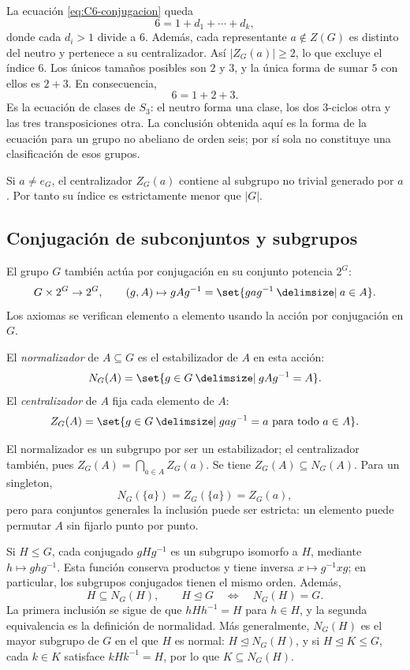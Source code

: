 La ecuación \eqref{eq:C6-conjugacion} queda
\[
6=1+d_1+\cdots+d_k,
\]
donde cada $d_i>1$ divide a $6$. Además, cada representante $a\notin Z(G)$ es distinto del neutro y pertenece a su centralizador. Así $|Z_G(a)|\ge2$, lo que excluye el índice $6$. Los únicos tamaños posibles son $2$ y $3$, y la única forma de sumar $5$ con ellos es $2+3$. En consecuencia,
\[
6=1+2+3.
\]
Es la ecuación de clases de $S_3$: el neutro forma una clase, los dos $3$-ciclos otra y las tres transposiciones otra. La conclusión obtenida aquí es la forma de la ecuación para un grupo no abeliano de orden seis; por sí sola no constituye una clasificación de esos grupos.
\begin{obs}
Si $a\ne e_G$, el centralizador $Z_G(a)$ contiene al subgrupo no trivial generado por $a$. Por tanto su índice es estrictamente menor que $|G|$.
\end{obs}

\subsection{Conjugación de subconjuntos y subgrupos}\label{tema:6-3-1}
El grupo $G$ también actúa por conjugación en su conjunto potencia $2^G$:
\[
G\times2^G\to2^G,\qquad(g,A)\mapsto gAg^{-1}
=\set{gag^{-1}\given a\in A}.
\]
Los axiomas se verifican elemento a elemento usando la acción por conjugación en $G$.

\begin{defi}
El \emph{normalizador} de $A\subseteq G$ es el estabilizador de $A$ en esta acción:
\[
N_G(A)=\set{g\in G\given gAg^{-1}=A}.
\]
El \emph{centralizador} de $A$ fija cada elemento de $A$:
\[
Z_G(A)=\set{g\in G\given gag^{-1}=a\text{ para todo }a\in A}.
\]
\end{defi}
El normalizador es un subgrupo por ser un estabilizador; el centralizador también, pues $Z_G(A)=\bigcap_{a\in A}Z_G(a)$. Se tiene $Z_G(A)\subseteq N_G(A)$. Para un singleton,
\[
N_G(\{a\})=Z_G(\{a\})=Z_G(a),
\]
pero para conjuntos generales la inclusión puede ser estricta: un elemento puede permutar $A$ sin fijarlo punto por punto.

Si $H\le G$, cada conjugado $gHg^{-1}$ es un subgrupo isomorfo a $H$, mediante $h\mapsto ghg^{-1}$. Esta función conserva productos y tiene inversa $x\mapsto g^{-1}xg$; en particular, los subgrupos conjugados tienen el mismo orden. Además,
\[
H\subseteq N_G(H),\qquad
H\trianglelefteq G\quad\Longleftrightarrow\quad N_G(H)=G.
\]
La primera inclusión se sigue de que $hHh^{-1}=H$ para $h\in H$, y la segunda equivalencia es la definición de normalidad. Más generalmente, $N_G(H)$ es el mayor subgrupo de $G$ en el que $H$ es normal: $H\trianglelefteq N_G(H)$, y si $H\trianglelefteq K\le G$, cada $k\in K$ satisface $kHk^{-1}=H$, por lo que $K\subseteq N_G(H)$.

